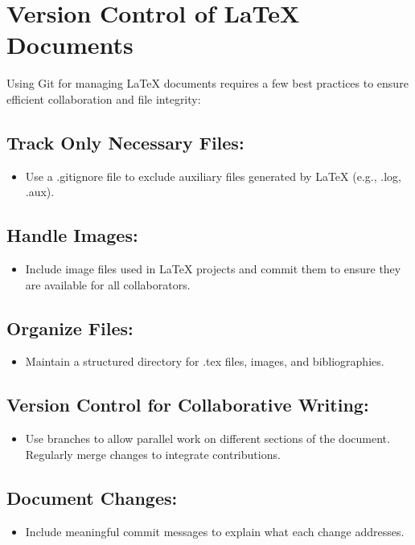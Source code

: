 \documentclass{article}
\begin{document}
\section{Version Control of LaTeX Documents}
Using Git for managing LaTeX documents requires a few best practices to ensure efficient collaboration and file integrity:
\subsection{Track Only Necessary Files:}
\begin{itemize}
    \item Use a .gitignore file to exclude auxiliary files generated by LaTeX (e.g., .log, .aux).
\end{itemize}
\subsection{Handle Images:}
\begin{itemize}
    \item 
Include image files used in LaTeX projects and commit them to ensure they are available for all collaborators.
\end{itemize}
\subsection{Organize Files:}
\begin{itemize}
    \item Maintain a structured directory for .tex files, images, and bibliographies.
\end{itemize}
\subsection{Version Control for Collaborative Writing:}
\begin{itemize}
    \item 
Use branches to allow parallel work on different sections of the document.
Regularly merge changes to integrate contributions.
\end{itemize}
\subsection{Document Changes:}
\begin{itemize}
    \item Include meaningful commit messages to explain what each change addresses.
\end{itemize}
\end{document}
